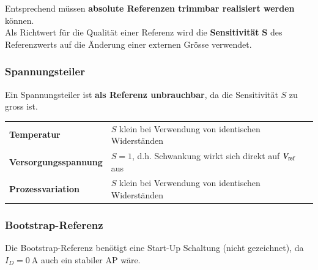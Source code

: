 \smallskip

Entsprechend müssen \textbf{absolute Referenzen trimmbar realisiert werden} können. \\
Als Richtwert für die Qualität einer Referenz wird die \textbf{Sensitivität} $\bm{S}$ des Referenzwerts auf die Änderung einer externen Grösse verwendet.

\subsubsection{Spannungsteiler}

Ein Spannungsteiler ist \textbf{als Referenz unbrauchbar}, da die Sensitivität $S$ zu gross ist.

\smallskip

\begin{tabular}{l l}
    \textbf{Temperatur}             & $S$ klein bei Verwendung von identischen Widerständen             \\
    \textbf{Versorgungsspannung}    & $S=1$, d.h. Schwankung wirkt sich direkt auf $V_{\rm ref}$ aus    \\
    \textbf{Prozessvariation}       & $S$ klein bei Verwendung von identischen Widerständen
\end{tabular}



\subsubsection{Bootstrap-Referenz}

Die Bootstrap-Referenz benötigt eine Start-Up Schaltung (nicht gezeichnet), da $I_D = \qty{0}{\ampere}$ auch ein stabiler AP wäre. 

